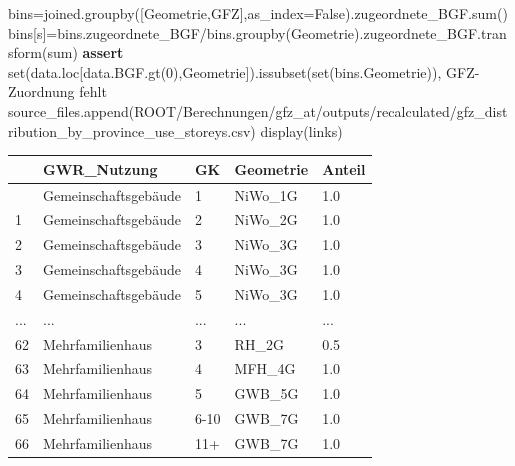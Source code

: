 \documentclass[
  ngerman,
  a4paper,
  DIV=11]{scrreprt}
\newenvironment{Shaded}{\begin{snugshade}}{\end{snugshade}}
\newcommand{\BuiltInTok}[1]{\textcolor[rgb]{0.00,0.23,0.31}{#1}}
\newcommand{\ControlFlowTok}[1]{\textcolor[rgb]{0.00,0.23,0.31}{\textbf{#1}}}
\newcommand{\DecValTok}[1]{\textcolor[rgb]{0.68,0.00,0.00}{#1}}
\newcommand{\NormalTok}[1]{\textcolor[rgb]{0.00,0.23,0.31}{#1}}
\newcommand{\OperatorTok}[1]{\textcolor[rgb]{0.37,0.37,0.37}{#1}}
\newcommand{\StringTok}[1]{\textcolor[rgb]{0.13,0.47,0.30}{#1}}
\newcommand{\VariableTok}[1]{\textcolor[rgb]{0.07,0.07,0.07}{#1}}
\newcounter{none} %
\begin{document}
\begin{Shaded}
\begin{Highlighting}[]
\NormalTok{bins}\OperatorTok{=}\NormalTok{joined.groupby([}\StringTok{\textquotesingle{}Geometrie\textquotesingle{}}\NormalTok{,}\StringTok{\textquotesingle{}GFZ\textquotesingle{}}\NormalTok{],as\_index}\OperatorTok{=}\VariableTok{False}\NormalTok{).zugeordnete\_BGF.}\BuiltInTok{sum}\NormalTok{()}
\NormalTok{bins[}\StringTok{\textquotesingle{}s\textquotesingle{}}\NormalTok{]}\OperatorTok{=}\NormalTok{bins.zugeordnete\_BGF}\OperatorTok{/}\NormalTok{bins.groupby(}\StringTok{\textquotesingle{}Geometrie\textquotesingle{}}\NormalTok{).zugeordnete\_BGF.transform(}\StringTok{\textquotesingle{}sum\textquotesingle{}}\NormalTok{)}
\ControlFlowTok{assert} \BuiltInTok{set}\NormalTok{(data.loc[data.BGF.gt(}\DecValTok{0}\NormalTok{),}\StringTok{\textquotesingle{}Geometrie\textquotesingle{}}\NormalTok{]).issubset(}\BuiltInTok{set}\NormalTok{(bins.Geometrie)), }\StringTok{\textquotesingle{}GFZ{-}Zuordnung fehlt\textquotesingle{}}
\NormalTok{source\_files.append(ROOT}\OperatorTok{/}\StringTok{\textquotesingle{}Berechnungen/gfz\_at/outputs/recalculated/gfz\_distribution\_by\_province\_use\_storeys.csv\textquotesingle{}}\NormalTok{)}
\NormalTok{display(links)}
\end{Highlighting}
\end{Shaded}

{\def\LTcaptype{none} %
\begin{longtable}[]{@{}lllll@{}}
\toprule\noalign{}
& GWR\_Nutzung & GK & Geometrie & Anteil \\
\midrule\noalign{}
\endhead
\bottomrule\noalign{}
\endlastfoot
0 & Gemeinschaftsgebäude & 1 & NiWo\_1G & 1.0 \\
1 & Gemeinschaftsgebäude & 2 & NiWo\_2G & 1.0 \\
2 & Gemeinschaftsgebäude & 3 & NiWo\_3G & 1.0 \\
3 & Gemeinschaftsgebäude & 4 & NiWo\_3G & 1.0 \\
4 & Gemeinschaftsgebäude & 5 & NiWo\_3G & 1.0 \\
... & ... & ... & ... & ... \\
62 & Mehrfamilienhaus & 3 & RH\_2G & 0.5 \\
63 & Mehrfamilienhaus & 4 & MFH\_4G & 1.0 \\
64 & Mehrfamilienhaus & 5 & GWB\_5G & 1.0 \\
65 & Mehrfamilienhaus & 6-10 & GWB\_7G & 1.0 \\
66 & Mehrfamilienhaus & 11+ & GWB\_7G & 1.0 \\
\end{longtable}
}
\end{document}

